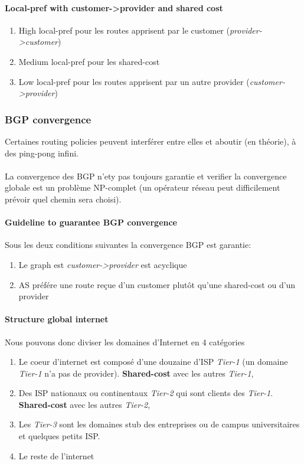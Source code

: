 \paragraph{Local-pref with customer->provider and shared cost}
\begin{enumerate}
    \item High local-pref pour les routes apprisent par le customer (\textit{provider->customer})
    \item Medium local-pref pour les shared-cost
    \item Low local-pref pour les routes apprisent par un autre provider (\textit{customer->provider})
\end{enumerate}


\subsubsection{BGP convergence}
Certaines routing policies peuvent interférer entre elles et aboutir (en théorie),
à des ping-pong infini.

\paragraph{ } La convergence des BGP n'ety pas toujours garantie et verifier la
convergence globale est un problème NP-complet (un opérateur réseau peut difficilement prévoir quel chemin sera choisi).

\paragraph{Guideline to guarantee BGP convergence} Sous les deux conditions  suivantes la convergence BGP est garantie:
\begin{enumerate}
    \item Le graph est \textit{customer->provider} est acyclique
    \item AS préfére une route reçue d'un customer plutôt qu'une shared-cost ou d'un provider
\end{enumerate}

\paragraph{Structure global internet} Nous pouvons donc diviser les domaines d'Internet en 4 catégories
\begin{enumerate}
\item Le coeur d'internet est composé d'une douzaine d'ISP \textit{Tier-1} (un domaine \textit{Tier-1} n'a pas de provider). \textbf{Shared-cost} avec les autres \textit{Tier-1},
\item Des ISP nationaux ou continentaux \textit{Tier-2} qui sont clients des \textit{Tier-1}. \textbf{Shared-cost} avec les autres \textit{Tier-2},
\item Les \textit{Tier-3} sont les domaines stub des entreprises ou de campus universitaires et quelques petits ISP.
\item Le reste de l'internet
\end{enumerate}

